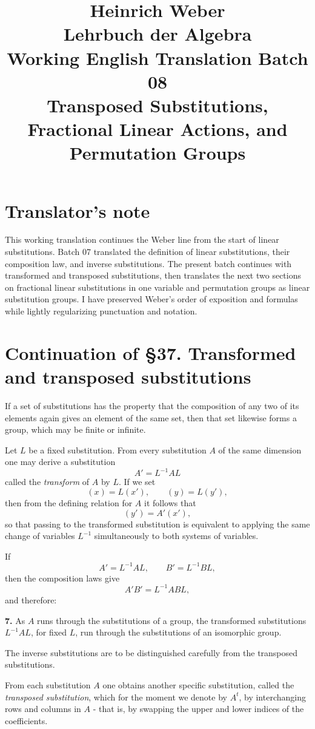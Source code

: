 \documentclass[11pt]{article}
\title{Heinrich Weber\\Lehrbuch der Algebra\\Working English Translation Batch 08\\Transposed Substitutions, Fractional Linear Actions, and Permutation Groups}
\author{}
\date{}
\begin{document}
\maketitle

\section*{Translator's note}
This working translation continues the Weber line from the start of linear substitutions. Batch 07 translated the definition of linear substitutions, their composition law, and inverse substitutions. The present batch continues with transformed and transposed substitutions, then translates the next two sections on fractional linear substitutions in one variable and permutation groups as linear substitution groups. I have preserved Weber's order of exposition and formulas while lightly regularizing punctuation and notation.

\section*{Continuation of \S 37. Transformed and transposed substitutions}

If a set of substitutions has the property that the composition of any two of its elements again gives an element of the same set, then that set likewise forms a group, which may be finite or infinite.

Let $L$ be a fixed substitution. From every substitution $A$ of the same dimension one may derive a substitution
\[
A' = L^{-1}AL
\tag{21}
\]
called the \emph{transform} of $A$ by $L$.
If we set
\[
(x)=L(x'),\qquad (y)=L(y'),
\tag{22}
\]
then from the defining relation for $A$ it follows that
\[
(y') = A'(x'),
\tag{23}
\]
so that passing to the transformed substitution is equivalent to applying the same change of variables $L^{-1}$ simultaneously to both systems of variables.

If
\[
A' = L^{-1}AL,\qquad B' = L^{-1}BL,
\]
then the composition laws give
\[
A'B' = L^{-1}ABL,
\]
and therefore:

\medskip
\noindent\textbf{7.}
As $A$ runs through the substitutions of a group, the transformed substitutions $L^{-1}AL$, for fixed $L$, run through the substitutions of an isomorphic group.

\medskip
The inverse substitutions are to be distinguished carefully from the transposed substitutions.

From each substitution $A$ one obtains another specific substitution, called the \emph{transposed substitution}, which for the moment we denote by $A^{t}$, by interchanging rows and columns in $A$ - that is, by swapping the upper and lower indices of the coefficients.
\end{document}
